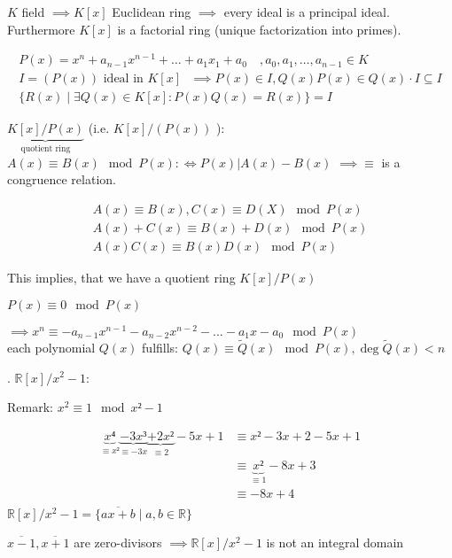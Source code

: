 $K$ field $\implies K[x]$ Euclidean ring $\implies$ every ideal is a principal ideal. Furthermore $K[x]$ is a factorial ring (unique factorization into primes).

\begin{align*}
  P(x)= x^n + a_{n-1} x^{n-1} + \ldots + a_1 x_1 + a_0 \quad ,a_0, a_1, \ldots ,a_{n-1} \in K \\
  I = (P(x)) \text{ ideal in $K[x]$ } \implies P(x) \in I, Q(x)P(x) \in Q(x) \cdot I \subseteq I \\
  \{R(x) \mid \exists Q(x) \in K[x] : P(x)Q(x) = R(x)\} = I
\end{align*}

$\underbrace{K[x]/ P(x)}_{\text{quotient ring}}$ (i.e. $K[x] / (P(x))$ ): $A(x) \equiv B(x) \mod P(x) :\Leftrightarrow P(x) | A(x) - B(x)$ $\implies \equiv $ is a congruence relation.

\begin{align*}
  A(x) \equiv B(x), C(x) \equiv D(X) \mod P(x) \\
  A(x) + C(x) \equiv B(x) + D(x) \mod P(x) \\
  A(x)C(x) \equiv B(x) D(x) \mod P(x)
\end{align*}

This implies, that we have a quotient ring $K[x]/ P(x)$

$P(x) \equiv 0 \mod P(x)$

$\implies x^n \equiv -a_{n-1}x^{n-1} - a_{n-2}x^{n-2} - \ldots - a_1 x - a_0 \mod P(x)$\\
each polynomial $Q(x)$ fulfills:
$Q(x) \equiv \tilde{Q}(x) \mod P(x), \deg \tilde{Q}(x)<n$

\Example.
$\mathbb{R}[x] / x^2-1$:
\begin{leftbar}
  Remark: $x^2 \equiv 1 \mod {x² -1}$
\end{leftbar}\vspace{-1cm}
\begin{align*}
  \underbrace{x⁴}_{\equiv x²}
  \underbrace{-3x³}_{\equiv -3x}
  \underbrace{+2x²}_{\equiv 2}
  -5x + 1                       & \equiv x² - 3x +2 - 5x + 1\\
                                & \equiv \underbrace{x²}_{\equiv 1} - 8x + 3\\
                                & \equiv -8x + 4\\
\end{align*}
$\mathbb{R}[x] / x^2 -1 = \{ \overline{ax+b} \mid a,b \in \mathbb{R} \}$

$\overline{x-1}, \overline{x+1}$ are zero-divisors $\implies \mathbb{R}[x] / x^2 -1$ is not an integral domain

